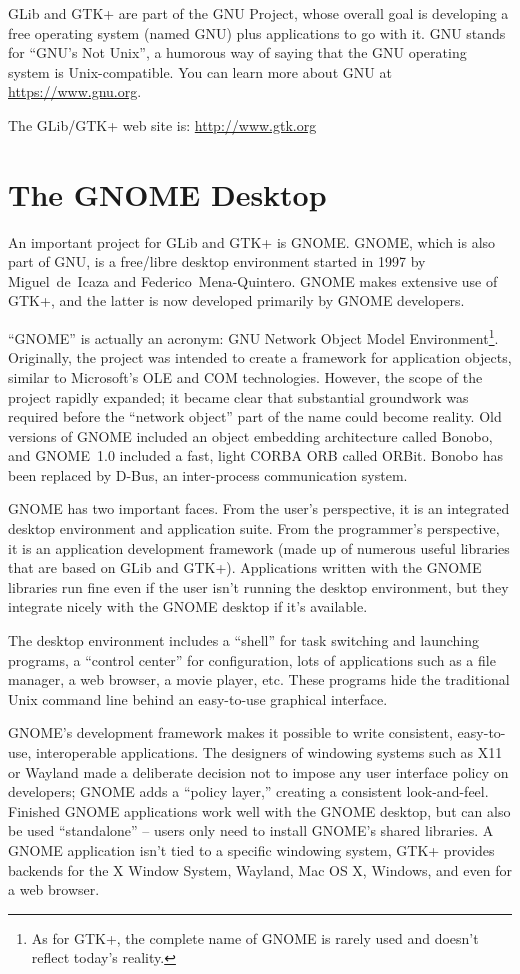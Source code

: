 GLib and GTK+ are part of the GNU Project, whose overall goal is developing a free operating system (named GNU) plus applications to go with it. GNU stands for ``GNU's Not Unix'', a humorous way of saying that the GNU operating system is Unix-compatible. You can learn more about GNU at \url{https://www.gnu.org}.

The GLib/GTK+ web site is: \url{http://www.gtk.org}

\section{The GNOME Desktop}

An important project for GLib and GTK+ is GNOME. GNOME, which is also part of GNU, is a free/libre desktop environment started in 1997 by Miguel~de~Icaza and Federico~Mena-Quintero. GNOME makes extensive use of GTK+, and the latter is now developed primarily by GNOME developers.

``GNOME'' is actually an acronym: GNU Network Object Model Environment\footnote{As for GTK+, the complete name of GNOME is rarely used and doesn't reflect today's reality.}. Originally, the project was intended to create a framework for application objects, similar to Microsoft's OLE and COM technologies. However, the scope of the project rapidly expanded; it became clear that substantial groundwork was required before the ``network object'' part of the name could become reality. Old versions of GNOME included an object embedding architecture called Bonobo, and GNOME~1.0 included a fast, light CORBA ORB called ORBit. Bonobo has been replaced by D-Bus, an inter-process communication system.

GNOME has two important faces. From the user's perspective, it is an integrated desktop environment and application suite. From the programmer's perspective, it is an application development framework (made up of numerous useful libraries that are based on GLib and GTK+). Applications written with the GNOME libraries run fine even if the user isn't running the desktop environment, but they integrate nicely with the GNOME desktop if it's available.

The desktop environment includes a ``shell'' for task switching and launching programs, a ``control center'' for configuration, lots of applications such as a file manager, a web browser, a movie player, etc. These programs hide the traditional Unix command line behind an easy-to-use graphical interface.

GNOME's development framework makes it possible to write consistent, easy-to-use, interoperable applications. The designers of windowing systems such as X11 or Wayland made a deliberate decision not to impose any user interface policy on developers; GNOME adds a ``policy layer,'' creating a consistent look-and-feel. Finished GNOME applications work well with the GNOME desktop, but can also be used ``standalone'' -- users only need to install GNOME's shared libraries. A GNOME application isn't tied to a specific windowing system, GTK+ provides backends for the X Window System, Wayland, Mac OS X, Windows, and even for a web browser.

